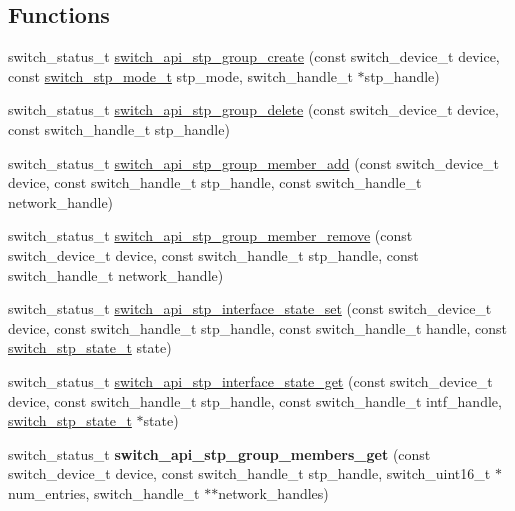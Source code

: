 \subsection*{Functions}
\begin{DoxyCompactItemize}
\item 
switch\+\_\+status\+\_\+t \hyperlink{group__stp_gafb0f5ccd942a574ea1264e174239af6e}{switch\+\_\+api\+\_\+stp\+\_\+group\+\_\+create} (const switch\+\_\+device\+\_\+t device, const \hyperlink{group__stp_ga035989f5b66364811135ccdf18d03e9b}{switch\+\_\+stp\+\_\+mode\+\_\+t} stp\+\_\+mode, switch\+\_\+handle\+\_\+t $\ast$stp\+\_\+handle)
\item 
switch\+\_\+status\+\_\+t \hyperlink{group__stp_ga86e410c6b12fcf88fa7ec84a3a57a6ad}{switch\+\_\+api\+\_\+stp\+\_\+group\+\_\+delete} (const switch\+\_\+device\+\_\+t device, const switch\+\_\+handle\+\_\+t stp\+\_\+handle)
\item 
switch\+\_\+status\+\_\+t \hyperlink{group__stp_gaab9418d721ed1abba5b6ee3b24c98b40}{switch\+\_\+api\+\_\+stp\+\_\+group\+\_\+member\+\_\+add} (const switch\+\_\+device\+\_\+t device, const switch\+\_\+handle\+\_\+t stp\+\_\+handle, const switch\+\_\+handle\+\_\+t network\+\_\+handle)
\item 
switch\+\_\+status\+\_\+t \hyperlink{group__stp_ga2cc5a14c62f7f4a4cb31b549b9d32026}{switch\+\_\+api\+\_\+stp\+\_\+group\+\_\+member\+\_\+remove} (const switch\+\_\+device\+\_\+t device, const switch\+\_\+handle\+\_\+t stp\+\_\+handle, const switch\+\_\+handle\+\_\+t network\+\_\+handle)
\item 
switch\+\_\+status\+\_\+t \hyperlink{group__stp_gab74d12ab01cbf7ad799f1f9853ceec51}{switch\+\_\+api\+\_\+stp\+\_\+interface\+\_\+state\+\_\+set} (const switch\+\_\+device\+\_\+t device, const switch\+\_\+handle\+\_\+t stp\+\_\+handle, const switch\+\_\+handle\+\_\+t handle, const \hyperlink{group__stp_ga487b2b1cdeaa476047d2022273f58a56}{switch\+\_\+stp\+\_\+state\+\_\+t} state)
\item 
switch\+\_\+status\+\_\+t \hyperlink{group__stp_gac5a755098cfd3d003b5cb428af2bba03}{switch\+\_\+api\+\_\+stp\+\_\+interface\+\_\+state\+\_\+get} (const switch\+\_\+device\+\_\+t device, const switch\+\_\+handle\+\_\+t stp\+\_\+handle, const switch\+\_\+handle\+\_\+t intf\+\_\+handle, \hyperlink{group__stp_ga487b2b1cdeaa476047d2022273f58a56}{switch\+\_\+stp\+\_\+state\+\_\+t} $\ast$state)
\item 
\hypertarget{group__stp_gacfbc89a1ca729d39aae3028866014fbb}{switch\+\_\+status\+\_\+t {\bfseries switch\+\_\+api\+\_\+stp\+\_\+group\+\_\+members\+\_\+get} (const switch\+\_\+device\+\_\+t device, const switch\+\_\+handle\+\_\+t stp\+\_\+handle, switch\+\_\+uint16\+\_\+t $\ast$num\+\_\+entries, switch\+\_\+handle\+\_\+t $\ast$$\ast$network\+\_\+handles)}\label{group__stp_gacfbc89a1ca729d39aae3028866014fbb}


\end{DoxyCompactItemize}
